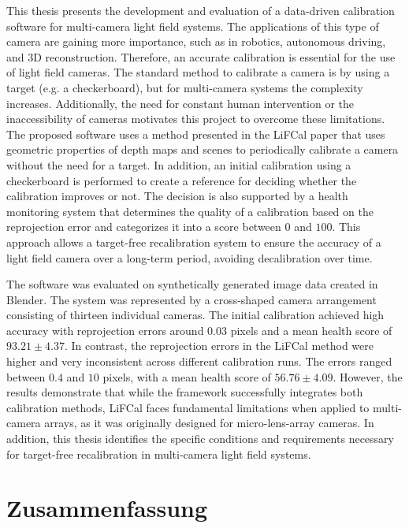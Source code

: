 \documentclass[12pt]{scrartcl}
\begin{document}
This thesis presents the development and evaluation of a data-driven calibration software for multi-camera light field systems. The applications of this type of camera are gaining more importance, such as in robotics, autonomous driving, and 3D reconstruction. Therefore, an accurate calibration is essential for the use of light field cameras. The standard method to calibrate a camera is by using a target (e.g. a checkerboard), but for multi-camera systems the complexity increases. Additionally, the need for constant human intervention or the inaccessibility of cameras motivates this project to overcome these limitations. The proposed software uses a method presented in the LiFCal paper that uses geometric properties of depth maps and scenes to periodically calibrate a camera without the need for a target. In addition, an initial calibration using a checkerboard is performed to create a reference for deciding whether the calibration improves or not. The decision is also supported by a health monitoring system that determines the quality of a calibration based on the reprojection error and categorizes it into a score between $0$ and $100$. This approach allows a target-free recalibration system to ensure the accuracy of a light field camera over a long-term period, avoiding decalibration over time.
\newline

The software was evaluated on synthetically generated image data created in Blender. The system was represented by a cross-shaped camera arrangement consisting of thirteen individual cameras. The initial calibration achieved high accuracy with reprojection errors around $0.03$ pixels and a mean health score of $93.21 \pm 4.37$. In contrast, the reprojection errors in the LiFCal method were higher and very inconsistent across different calibration runs. The errors ranged between $0.4$ and $10$ pixels, with a mean health score of $56.76 \pm 4.09$. However, the results demonstrate that while the framework successfully integrates both calibration methods, LiFCal faces fundamental limitations when applied to multi-camera arrays, as it was originally designed for micro-lens-array cameras. In addition, this thesis identifies the specific conditions and requirements necessary for target-free recalibration in multi-camera light field systems.

\clearpage

\section*{Zusammenfassung}
\end{document}
